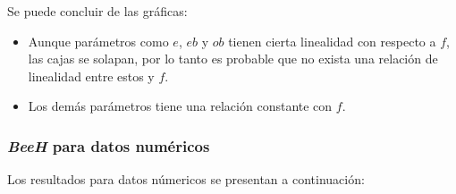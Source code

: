     Se puede concluir de las gráficas:
\begin{itemize}
	\item Aunque parámetros como $e$, $eb$ y $ob$ tienen cierta
linealidad con respecto a $f$, las cajas se solapan, por lo tanto
es probable que no exista una relación de linealidad entre estos
y $f$.
	\item Los demás parámetros tiene una relación constante con
$f$.
\end{itemize}

\subsubsection{\emph{BeeH} para datos numéricos}

    Los resultados para datos númericos se presentan a continuación:

\begin{figure}[H]
  \centering
  \label{fig:f_bee1}
\end{figure}

